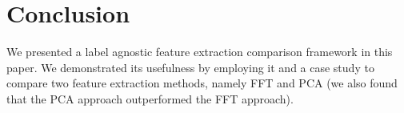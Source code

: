 \documentclass{article}
\begin{document}
\section{Conclusion}
\label{sec:ref}
We presented a label agnostic feature extraction comparison framework in this paper. We demonstrated its usefulness by employing it and a case study to compare two feature extraction methods,
namely FFT and PCA (we also found that the PCA approach outperformed the FFT approach).




\end{document}
